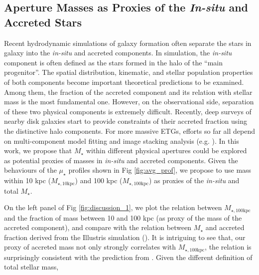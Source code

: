 \documentclass[a4paper,fleqn,usenatbib]{mnras}
\def\rbcg{\texttt{cenHighMh}}
\def\nbcg{\texttt{cenLowMh}}
\def\mstar{{$M_{\star}$}}
\def\mhalo{{$M_{\mathrm{halo}}$}}
\def\logms{{$\log (M_{\star}/M_{\odot})$}}
\def\minn{{$M_{\star,10\mathrm{kpc}}$}}
\def\mtot{{$M_{\star,100\mathrm{kpc}}$}}
\def\mden{{$\mu_{\star}$}}
\begin{document}
\subsection{Aperture Masses as Proxies of the \textit{In-situ} and Accreted Stars}
    \label{ssec:insitu}
    
    Recent hydrodynamic simulations of galaxy formation often separate the stars in 
    galaxy into the \textit{in-situ} and accreted components. 
    In simulation, the \textit{in-situ} component is often defined as the stars formed 
    in the halo of the ``main progenitor''.  
    The spatial distribution, kinematic, and stellar population properties of both 
    components become important theoretical predictions to be examined. 
    Among them, the fraction of the accreted component and its relation with stellar 
    mass is the most fundamental one. 
    However, on the observational side, separation of these two physical components 
    is extremely difficult. 
    Recently, deep surveys of nearby disk galaxies start to provide constraints of 
    their accreted fraction using the distinctive halo components. 
    For more massive ETGs, efforts so far all depend on multi-component model fitting
    and image stacking analysis (e.g. \citealt{Huang2013a, dSouza2014, Spavone2017}).
    In this work, we propose that \mstar{} within different physical apertures could 
    be explored as potential proxies of masses in \textit{in-situ} and accreted 
    components.  
    Given the behaviours of the \mden{} profiles shown in Fig \ref{fig:avg_prof}, 
    we propose to use mass within 10 kpc (\minn{}) and 100 kpc (\mtot{}) as proxies 
    of the \textit{in-situ} and total \mstar{}. 
    
    On the left panel of Fig \ref{fig:discussion_1}, we plot the relation between 
    \mtot{} and the fraction of mass between 10 and 100 kpc (as proxy of the mass of 
    the accreted component), and compare with the relation between \mstar{} and 
    accreted fraction derived from the Illustris simulation 
    (\citealt{RodriguezGomez2016}). 
    It is intriguing to see that, our proxy of accreted mass not only strongly 
    correlates with \mtot{}, the relation is surprisingly consistent with the 
    prediction from \citet{RodriguezGomez2016}. 
    Given the different definition of total stellar mass, 
    
    
    
   
\end{document}
